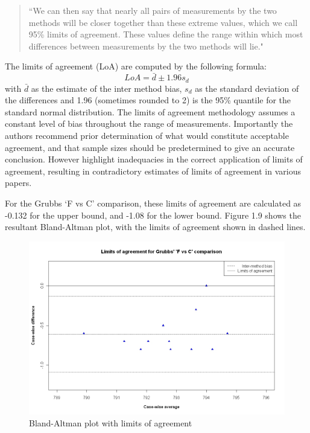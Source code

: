 \documentclass[Main.tex]{subfiles}
\begin{document}
\begin{quote}``We can then say that nearly all pairs
	of measurements by the two methods will be closer together than
	these extreme values, which we call 95\% limits of agreement.
	These values define the range within which most differences
	between measurements by the two methods will lie."
\end{quote}

The limits of agreement (LoA) are computed by the following formula:
\[
LoA = \bar{d} \pm 1.96 s_{d}
\]
with $\bar{d}$ as the estimate of the inter method bias, $s_{d}$
as the standard deviation of the differences and 1.96 (sometimes rounded to 2) is the 95\%
quantile for the standard normal distribution. The limits of agreement methodology assumes a constant level of bias throughout the range of measurements. Importantly the authors recommend prior determination of what would constitute acceptable
agreement, and that sample sizes should be predetermined to give an accurate conclusion. However \citet{mantha} highlight inadequacies in the correct application of limits of agreement, resulting in contradictory estimates of limits of agreement in various papers.



For the Grubbs `F vs C' comparison, these limits
of agreement are calculated as -0.132 for the upper bound, and
-1.08 for the lower bound. Figure 1.9 shows the resultant
Bland-Altman plot, with the limits of agreement shown in dashed
lines.


\begin{figure}[h!]
	\begin{center}
		\includegraphics[width=125mm]{images/GrubbsBAplot-LOA.jpeg}
		\caption{Bland-Altman plot with limits of agreement}\label{GrubbsBAplot-noLOA}
	\end{center}
\end{figure}
\end{document}
